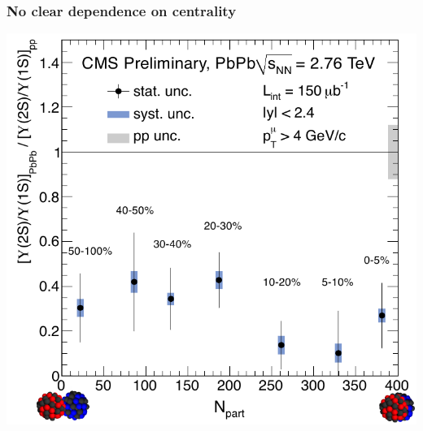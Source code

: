 \documentclass[compress]{beamer}
\begin{document}
\begin{frame}
\frametitle{No clear dependence on centrality}
\begin{center}
\includegraphics[width=0.75\linewidth]{dimuons/upsilon_doubleratio_centrality.png}
\end{center}
\end{frame}
\end{document}
